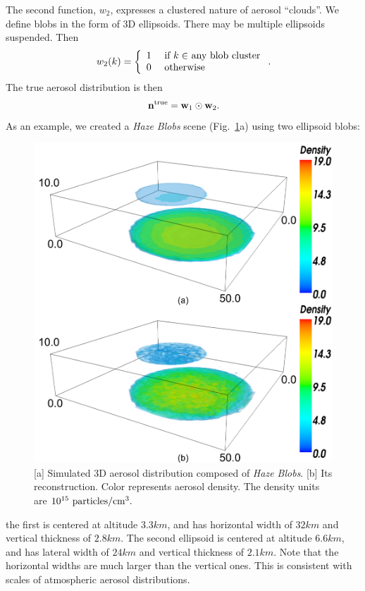 \documentclass[10pt,twocolumn,letterpaper]{article}
\newcommand{\yoavcomment}[1]{}
\renewcommand{\yoavcomment}[1]{#1} %
\begin{document}
The second function, $w_2$, expresses a clustered nature of aerosol ``clouds''. We define
blobs in the form of 3D ellipsoids. There may be multiple ellipsoids suspended.  
Then
\begin{equation}
  w_2(k) =
  \left\{
      \begin{array}{ll}
          1  & \mbox{ if $k\in$ any blob cluster} \\
          0  & \mbox{ otherwise}
    \label{eq:f2}
       \end{array}
  \right.
  .
  \hspace{-0.05cm}
\end{equation}
The true aerosol distribution is then
\begin{equation}
  \label{eq:ntrue}
  {\bf n}^{\rm true}={\bf w}_1\odot {\bf w}_2  .
  \hspace{-0.05cm}
\end{equation}
As an example,
we created a {\em Haze Blobs} scene (Fig.~\ref{fig:simulation1}a) using two ellipsoid blobs: \begin{figure}
  \centering
  \yoavcomment{\includegraphics[width=\columnwidth]{images/simulation1}}
  \caption{\small [a] Simulated 3D aerosol distribution composed of {\em Haze Blobs}. [b] Its reconstruction. Color represents aerosol density. The density units are
  $10^{15}~{\rm particles}/{\rm cm}^3.$}
  \label{fig:simulation1}
\end{figure}
the first is centered at altitude $3.3km$, and has horizontal width of $32km$ and vertical thickness of $2.8km$. The second ellipsoid is centered at altitude $6.6km$, and has lateral width of $24km$ and vertical thickness of $2.1km$. Note that the horizontal widths are much larger than the vertical ones. This is consistent with scales of atmospheric aerosol distributions.\\
\end{document}
